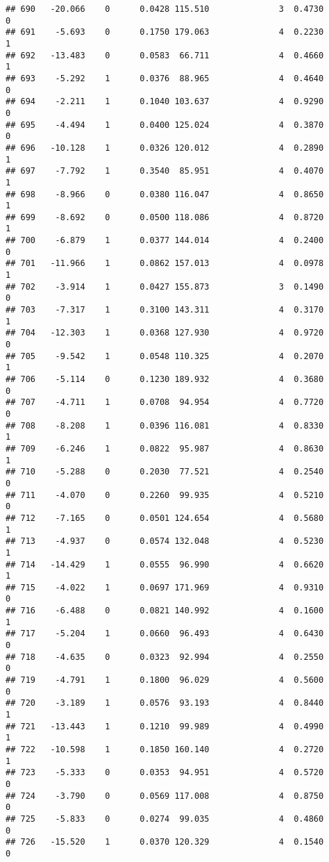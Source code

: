 \documentclass[
]{article}
\begin{document}
\begin{verbatim}
## 690   -20.066    0      0.0428 115.510              3  0.4730      0
## 691    -5.693    0      0.1750 179.063              4  0.2230      1
## 692   -13.483    0      0.0583  66.711              4  0.4660      1
## 693    -5.292    1      0.0376  88.965              4  0.4640      0
## 694    -2.211    1      0.1040 103.637              4  0.9290      0
## 695    -4.494    1      0.0400 125.024              4  0.3870      0
## 696   -10.128    1      0.0326 120.012              4  0.2890      1
## 697    -7.792    1      0.3540  85.951              4  0.4070      1
## 698    -8.966    0      0.0380 116.047              4  0.8650      1
## 699    -8.692    0      0.0500 118.086              4  0.8720      1
## 700    -6.879    1      0.0377 144.014              4  0.2400      0
## 701   -11.966    1      0.0862 157.013              4  0.0978      1
## 702    -3.914    1      0.0427 155.873              3  0.1490      0
## 703    -7.317    1      0.3100 143.311              4  0.3170      1
## 704   -12.303    1      0.0368 127.930              4  0.9720      0
## 705    -9.542    1      0.0548 110.325              4  0.2070      1
## 706    -5.114    0      0.1230 189.932              4  0.3680      0
## 707    -4.711    1      0.0708  94.954              4  0.7720      0
## 708    -8.208    1      0.0396 116.081              4  0.8330      1
## 709    -6.246    1      0.0822  95.987              4  0.8630      1
## 710    -5.288    0      0.2030  77.521              4  0.2540      0
## 711    -4.070    0      0.2260  99.935              4  0.5210      0
## 712    -7.165    0      0.0501 124.654              4  0.5680      1
## 713    -4.937    0      0.0574 132.048              4  0.5230      1
## 714   -14.429    1      0.0555  96.990              4  0.6620      1
## 715    -4.022    1      0.0697 171.969              4  0.9310      0
## 716    -6.488    0      0.0821 140.992              4  0.1600      1
## 717    -5.204    1      0.0660  96.493              4  0.6430      0
## 718    -4.635    0      0.0323  92.994              4  0.2550      0
## 719    -4.791    1      0.1800  96.029              4  0.5600      0
## 720    -3.189    1      0.0576  93.193              4  0.8440      1
## 721   -13.443    1      0.1210  99.989              4  0.4990      1
## 722   -10.598    1      0.1850 160.140              4  0.2720      1
## 723    -5.333    0      0.0353  94.951              4  0.5720      0
## 724    -3.790    0      0.0569 117.008              4  0.8750      0
## 725    -5.833    0      0.0274  99.035              4  0.4860      0
## 726   -15.520    1      0.0370 120.329              4  0.1540      0

\end{verbatim}
\end{document}
